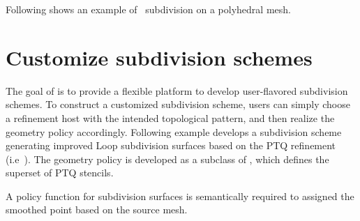 Following shows an example of \DS\ subdivision on a polyhedral mesh.

\section{Customize subdivision schemes}
The goal of  is to provide a flexible platform
to develop user-flavored subdivision schemes.
To construct a customized subdivision scheme, users can simply 
choose a refinement host with the intended topological pattern, 
and then realize the geometry policy accordingly. 
Following example develops a subdivision scheme
generating improved Loop subdivision surfaces based on the PTQ 
refinement (i.e~). 
The geometry policy is developed as a subclass 
of , which defines the superset of PTQ stencils.

A policy function for subdivision surfaces is semantically
required to assigned the smoothed point based on the source mesh.

